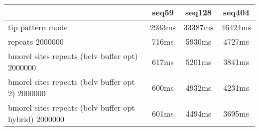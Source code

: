 \begin{tabular}{|l|c|c|c|}
\hline
 & seq59 & seq128 & seq404  \\
\hline
tip pattern mode &  2933ms &  33387ms &  46424ms\\
\hline
repeats 2000000 &  716ms &  5930ms &  4727ms\\
\hline
bmorel sites repeats (bclv buffer opt) 2000000 &  617ms &  5201ms &  3841ms\\
\hline
bmorel sites repeats (bclv buffer opt 2) 2000000 &  600ms &  4932ms &  4231ms\\
\hline
bmorel sites repeats (bclv buffer opt hybrid) 2000000 &  601ms &  4494ms &  3695ms\\
\hline
\end{tabular}

